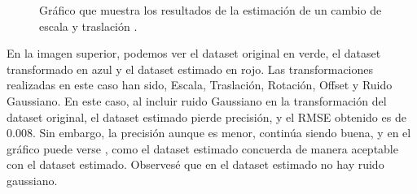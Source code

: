 \begin{figure}[H]
\begin{center}
\hspace{0.5cm}

\end{center}

\caption{Gráfico que muestra los resultados de la estimación de un cambio de escala y traslación .}
\end{figure}

En la imagen superior, podemos ver el dataset original en verde, el dataset transformado en azul y el dataset estimado en rojo.
Las transformaciones realizadas en este caso han sido, Escala, Traslación, Rotación, Offset y Ruido Gaussiano.
En este caso, al incluir ruido Gaussiano en la transformación del dataset original, el dataset estimado pierde precisión, y el RMSE obtenido es de  0.008.
Sin embargo, la precisión aunque es menor, continúa siendo buena, y en el gráfico puede verse , como el dataset estimado concuerda de manera aceptable con el dataset estimado.
Observesé que en el dataset estimado no hay ruido gaussiano.


